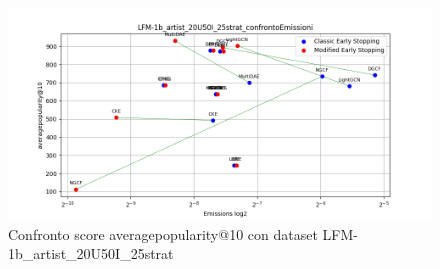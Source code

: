 \begin{figure}[H]
    \centering
    \includegraphics[width=\linewidth, trim=0 0 0 0]{images/averagepopularity@10_LFM-1b_artist_20U50I_25strat_comparison.png}
    \caption{Confronto score averagepopularity@10 con dataset LFM-1b\_artist\_20U50I\_25strat}
\end{figure}


